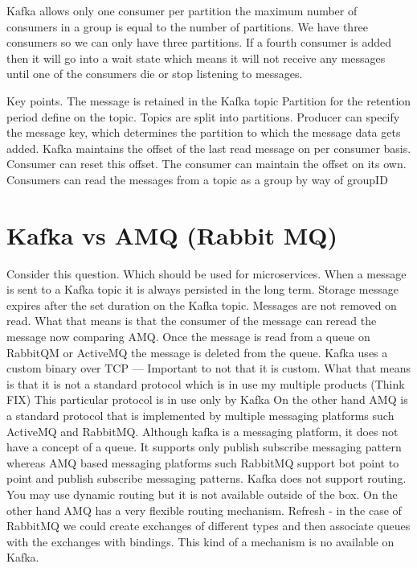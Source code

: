 \documentclass[a4paper, 11pt]{book}
\begin{document}
    Kafka allows only one consumer per partition the maximum number of consumers in a group is equal to the number of partitions.
    We have three consumers so we can only have three partitions.
    If a fourth consumer is added then it will go into a wait state which means it will not receive any messages until one of the consumers die or stop listening to messages.

    Key points.
    The message is retained in the Kafka topic Partition for the retention period define on the topic.
    Topics are split into partitions.
    Producer can specify the message key, which determines the partition to which the message data gets added.
    Kafka maintains the offset of the last read message on per consumer basis.
    Consumer can reset this offset.
    The consumer can maintain the offset on its own.
    Consumers can read the messages from a topic as a group by way of groupID



    \section{Kafka vs AMQ (Rabbit MQ)}
    Consider this question. Which should be used for microservices.
    When a message is sent to a Kafka topic it is always persisted in the long term.
    Storage message expires after the set duration on the Kafka topic.
    Messages are not removed on read.
    What that means is that the consumer of the message can reread the message now comparing AMQ.
    Once the message is read from a queue on RabbitQM or ActiveMQ the message is deleted from the queue.
    Kafka uses a custom binary over TCP
    --- Important to not that it is custom.
    What that means is that it is not a standard protocol which is in use my multiple products (Think FIX)
    This particular protocol is in use only by Kafka
    On the other hand AMQ is a standard protocol that is implemented by multiple messaging platforms such ActiveMQ and RabbitMQ.
    Although kafka is a messaging platform, it does not have a concept of a queue.
    It supports only publish subscribe messaging pattern whereas AMQ based messaging platforms such RabbitMQ support bot point to point and publish subscribe messaging patterns.
    Kafka does not support routing.
    You may use dynamic routing but it is not available outside of the box.
    On the other hand AMQ has a very flexible routing mechanism.
    Refresh - in the case of RabbitMQ we could create exchanges of different types and then associate queues with the exchanges with bindings.
    This kind of a mechanism is no available on Kafka.
\end{document}
